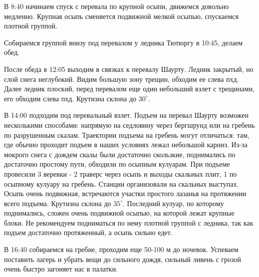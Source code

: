 В 8:40 начинаем спуск с перевала по крупной осыпи, движемся довольно медленно. Крупная осыпь сменяется подвижной мелкой осыпью, спускаемся плотной группой.

Собираемся группой внизу под перевалом у ледника Тютюргу в 10:45, делаем обед.

После обеда в 12:05 выходим в связках к перевалу Шаурту. Ледник закрытый, но слой снега неглубокий. Видим большую зону трещин, обходим ее слева пхд. Далее ледник плоский, перед перевалом еще один небольший взлет с трещинами, его обходим слева пхд. Крутизна склона до $30^\circ$.

В 14:00 подходим под перевальный взлет. Подъем на перевал Шаурту возможен несколькими способами: напрямую на седловину через бергшрунд или на гребень по разрушенным скалам. Траектории подъема на гребень могут отличаться: там, где обычно проходит подъем в наших условиях лежал небольшой карниз. Из-за мокрого снега с дождем скалы были достаточно скользкие, поднимались по достаточно простому пути, обходили по осыпным кулуарам. При подъеме провесили 3 веревки - 2 траверс через осыпь и выходы скальных плит, 1 по осыпному кулуару на гребень. Станции организовали на скальных
выступах. Осыпь очень подвижная, встречаются участки простого лазанья на протяжении всего подъема. Крутизна склона до $35^\circ$. Последний кулуар, по которому поднимались, сложен очень подвижной осыпью, на которой лежат крупные блоки. Не рекомендуем подниматься по нему плотной группой с ледника, так как подъем достаточно протяженный, а осыпь сильно едет.

В 16:40 собираемся на гребне, проходим еще 50-100 м до ночевок. Успеваем поставить лагерь и убрать вещи до сильного дождя, сильный ливень с грозой очень быстро загоняет нас в палатки.







